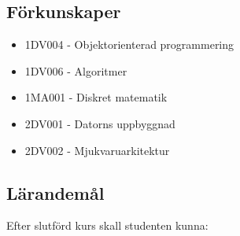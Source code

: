 \subsection*{Förkunskaper}

\begin{itemize}
\tightlist
\item
  1DV004 - Objektorienterad programmering
\item
  1DV006 - Algoritmer
\item
  1MA001 - Diskret matematik
\item
  2DV001 - Datorns uppbyggnad
\item
  2DV002 - Mjukvaruarkitektur
\end{itemize}

\subsection*{Lärandemål}

Efter slutförd kurs skall studenten kunna:

